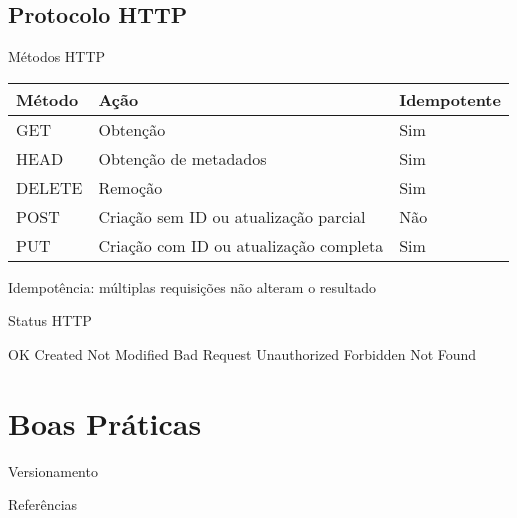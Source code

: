 \documentclass{beamer}
\begin{document}
\subsection{Protocolo HTTP}

\begin{frame}{Métodos HTTP}
  \begin{table}[]
  \begin{tabular}{@{}lll@{}}
  \toprule
  Método & Ação                                   & Idempotente \\ \midrule
  GET    & Obtenção                               & Sim         \\ \pause
  HEAD   & Obtenção de metadados                  & Sim         \\ \pause
  DELETE & Remoção                                & Sim         \\ \pause
  POST   & Criação sem ID ou atualização parcial  & Não         \\ \pause
  PUT    & Criação com ID ou atualização completa & Sim         \\ \bottomrule
  \end{tabular}
  \end{table}
  {\tiny Idempotência: múltiplas requisições não alteram o resultado}
\end{frame}

\begin{frame}{Status HTTP}
  \begin{outline}
     OK
     Created
     Not Modified
     Bad Request
     Unauthorized
     Forbidden
     Not Found
  \end{outline}
\end{frame}

\section{Boas Práticas}

\begin{frame}{Versionamento}
  
\end{frame}


\begin{frame}[allowframebreaks]{Referências}
  
\end{frame}
\end{document}
